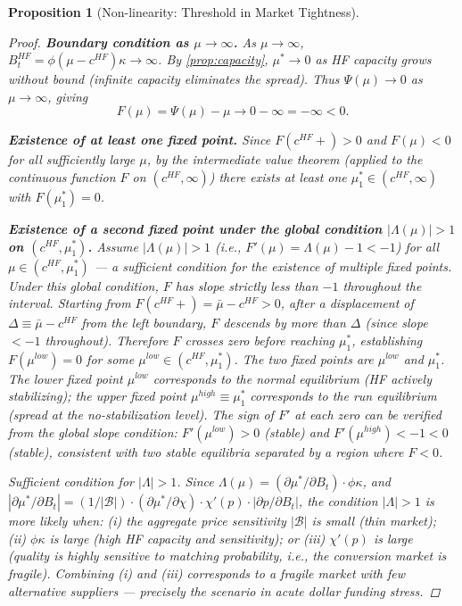 \documentclass[12pt]{article}
\newtheorem{proposition}{Proposition}
\theoremstyle{definition}
\newcommand{\1}[1]{\mathds{1}\left[#1\right]}
\begin{document}
\begin{proposition}[Non-linearity: Threshold in Market Tightness]
\begin{proof}
  \textbf{Boundary condition as $\mu \to \infty$.} As $\mu \to \infty$,
  $B_t^{HF} = \phi(\mu - c^{HF})\kappa \to \infty$. By \cref{prop:capacity},
  $\mu^* \to 0$ as HF capacity grows without bound (infinite capacity eliminates
  the spread). Thus $\Psi(\mu) \to 0$ as $\mu \to \infty$, giving
  \[
    F(\mu) = \Psi(\mu) - \mu \to 0 - \infty = -\infty < 0.
  \]

  \textbf{Existence of at least one fixed point.} Since $F(c^{HF}+) > 0$ and
  $F(\mu) < 0$ for all sufficiently large $\mu$, by the intermediate value
  theorem (applied to the continuous function $F$ on $(c^{HF}, \infty)$) there
  exists at least one $\mu_1^* \in (c^{HF}, \infty)$ with $F(\mu_1^*) = 0$.

  \textbf{Existence of a second fixed point under the global condition
  $|\Lambda(\mu)| > 1$ on $(c^{HF}, \mu_1^*)$.}
  Assume $|\Lambda(\mu)| > 1$ (i.e., $F'(\mu) = \Lambda(\mu) - 1 < -1$)
  for all $\mu \in (c^{HF}, \mu_1^*)$ --- a sufficient condition for the
  existence of multiple fixed points. Under this global condition, $F$ has
  slope strictly less than $-1$ throughout the interval. Starting from
  $F(c^{HF}+) = \bar\mu - c^{HF} > 0$, after a displacement of
  $\Delta \equiv \bar\mu - c^{HF}$ from the left boundary, $F$ descends
  by more than $\Delta$ (since slope $< -1$ throughout). Therefore $F$
  crosses zero before reaching $\mu_1^*$, establishing $F(\mu^{low}) = 0$
  for some $\mu^{low} \in (c^{HF}, \mu_1^*)$. The two fixed points are
  $\mu^{low}$ and $\mu_1^*$. The lower fixed point $\mu^{low}$ corresponds
  to the normal equilibrium (HF actively stabilizing); the upper fixed point
  $\mu^{high} \equiv \mu_1^*$ corresponds to the run equilibrium (spread
  at the no-stabilization level). The sign of $F'$ at each zero can be
  verified from the global slope condition: $F'(\mu^{low}) > 0$ (stable)
  and $F'(\mu^{high}) < -1 < 0$ (stable), consistent with two stable
  equilibria separated by a region where $F < 0$.

  \textit{Sufficient condition for $|\Lambda| > 1$.} Since $\Lambda(\mu) =
  (\partial\mu^*/\partial B_t)\cdot\phi\kappa$, and $|\partial\mu^*/\partial B_t|
  = (1/|\mathcal{B}|)\cdot(\partial\mu^*/\partial\chi)\cdot\chi'(p)\cdot|\partial p/
  \partial B_t|$, the condition $|\Lambda| > 1$ is more likely when: (i) the
  aggregate price sensitivity $|\mathcal{B}|$ is small (thin market); (ii) $\phi\kappa$
  is large (high HF capacity and sensitivity); or (iii) $\chi'(p)$ is large
  (quality is highly sensitive to matching probability, i.e., the conversion
  market is fragile). Combining (i) and (iii) corresponds to a fragile market
  with few alternative suppliers --- precisely the scenario in acute dollar
  funding stress.


\end{proof}
\end{proposition}
\end{document}
